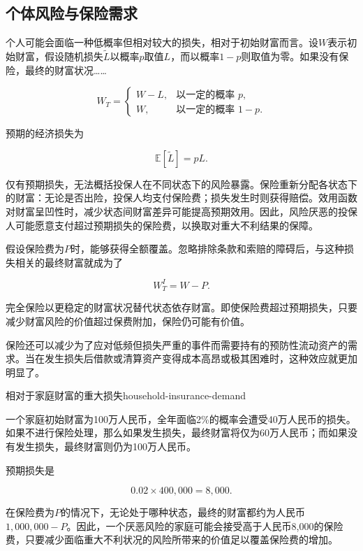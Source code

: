 \subsection{个体风险与保险需求}

个人可能会面临一种低概率但相对较大的损失，相对于初始财富而言。设$W$表示初始财富，假设随机损失$\tilde{L}$以概率$p$取值$L$，而以概率$1-p$则取值为零。如果没有保险，最终的财富状况……

\begin{equation}
W_T=
\begin{cases}
W-L, & \text{以一定的概率 } p,\\
W, & \text{以一定的概率 } 1-p.
\end{cases}
\label{eq:ch15-uninsured-wealth}
\end{equation}

预期的经济损失为

\begin{equation}
\mathbb{E}[\tilde{L}]=pL.
\label{eq:ch15-expected-loss-simple}
\end{equation}

仅有预期损失，无法概括投保人在不同状态下的风险暴露。保险重新分配各状态下的财富：无论是否出险，投保人均支付保险费；损失发生时则获得赔偿。效用函数对财富呈凹性时，减少状态间财富差异可能提高预期效用。因此，风险厌恶的投保人可能愿意支付超过预期损失的保险费，以换取对重大不利结果的保障。

假设保险费为$P$时，能够获得全额覆盖。忽略排除条款和索赔的障碍后，与这种损失相关的最终财富就成为了

\begin{equation}
W_T^{I}=W-P.
\label{eq:ch15-fully-insured-wealth}
\end{equation}

完全保险以更稳定的财富状况替代状态依存财富。即使保险费超过预期损失，只要减少财富风险的价值超过保费附加，保险仍可能有价值。

保险还可以减少为了应对低频但损失严重的事件而需要持有的预防性流动资产的需求。当在发生损失后借款或清算资产变得成本高昂或极其困难时，这种效应就更加明显了。

\begin{example}{相对于家庭财富的重大损失}{household-insurance-demand}

一个家庭初始财富为100万人民币，全年面临2\%的概率会遭受40万人民币的损失。如果不进行保险处理，那么如果发生损失，最终财富将仅为60万人民币；而如果没有发生损失，最终财富则仍为100万人民币。

预期损失是

$$
0.02\times 400{,}000=8{,}000.
$$

在保险费为$P$的情况下，无论处于哪种状态，最终的财富都约为人民币$1{,}000{,}000-P$。因此，一个厌恶风险的家庭可能会接受高于人民币8,000的保险费，只要减少面临重大不利状况的风险所带来的价值足以覆盖保险费的增加。

\end{example}


